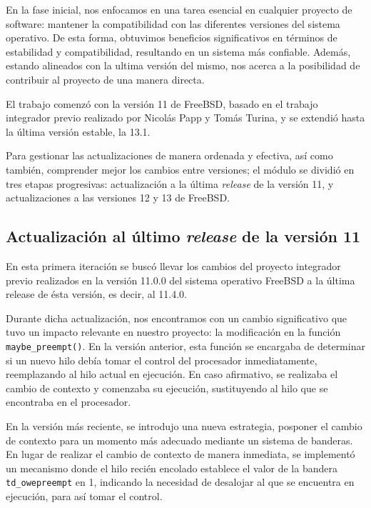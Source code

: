 En la fase inicial, nos enfocamos en una tarea esencial en cualquier proyecto de software: mantener la compatibilidad con las diferentes versiones del sistema operativo. De esta forma, obtuvimos beneficios significativos en términos de estabilidad y compatibilidad, resultando en un sistema más confiable. Además, estando alineados con la ultima versión del mismo, nos acerca a la posibilidad de contribuir al proyecto de una manera directa.\par

El trabajo comenzó con la versión 11 de FreeBSD, basado en el trabajo integrador previo realizado por Nicolás Papp y Tomás Turina, y se extendió hasta la última versión estable, la 13.1.\par

Para gestionar las actualizaciones de manera ordenada y efectiva, así como también, comprender mejor los cambios entre versiones; el módulo se dividió en tres etapas progresivas: actualización a la última \textit{release} de la versión 11, y actualizaciones a las versiones 12 y 13 de FreeBSD.\par


\subsection{Actualización al último \textit{release} de la versión 11}

En esta primera iteración se buscó llevar los cambios del proyecto integrador previo realizados en la versión 11.0.0 del sistema operativo FreeBSD a la última release de ésta versión, es decir, al 11.4.0.\par

Durante dicha actualización, nos encontramos con un cambio significativo que tuvo un impacto relevante en nuestro proyecto: la modificación en la función \verb|maybe_preempt()|. En la versión anterior, esta función se encargaba de determinar si un nuevo hilo debía tomar el control del procesador inmediatamente, reemplazando al hilo actual en ejecución. En caso afirmativo, se realizaba el cambio de contexto y comenzaba su ejecución, sustituyendo al hilo que se encontraba en el procesador.\par

En la versión más reciente, se introdujo una nueva estrategia, posponer el cambio de contexto para un momento más adecuado mediante un sistema de banderas. En lugar de realizar el cambio de contexto de manera inmediata, se implementó un mecanismo donde el hilo recién encolado establece el valor de la bandera \verb|td_owepreempt| en 1, indicando la necesidad de desalojar al que se encuentra en ejecución, para así tomar el control.\par

